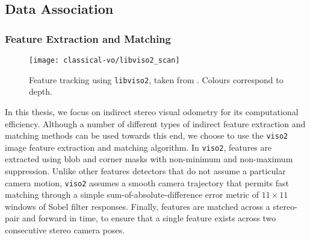 \subsection{Data Association}
\label{sec:vo_data_extraction}
\subsubsection{Feature Extraction and Matching}

\begin{figure}[h!]
\begin{center}
		\texttt{[image: classical-vo/libviso2\_scan]}
		\caption{Feature tracking using \texttt{libviso2}, taken from \cite{Geiger2011-xe}. Colours correspond to depth.}
  	\label{fig:vo_feature_tracking}
\end{center}
\end{figure}

In this thesis, we focus on indirect stereo visual odometry for its computational efficiency. Although a number of different types of indirect feature extraction and matching methods can be used towards this end, we choose to use the \texttt{viso2} \citep{Geiger2011-xe} image feature extraction and matching algorithm. In \texttt{viso2}, features are extracted using blob and corner masks with non-minimum and non-maximum suppression. Unlike other features detectors that do not assume a particular camera motion, \texttt{viso2} assumes a smooth camera trajectory that permits fast matching through a simple sum-of-absolute-difference error metric of $11 \times 11$ windows of Sobel filter responses. Finally, features are matched across a stereo-pair and forward in time, to ensure that a single feature exists across two consecutive stereo camera poses. 

